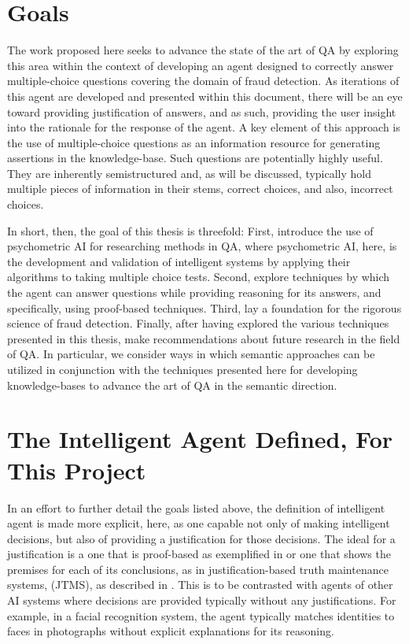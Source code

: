 \section{Goals}

The work proposed here seeks to advance the state of the art of QA by exploring this area within the context of developing an agent designed to correctly answer multiple-choice questions covering the domain of fraud detection.  As iterations of this agent are developed and presented within this document, there will be an eye toward providing justification of answers, and as such, providing the user insight into the rationale for the response of the agent. A key element of this approach is the use of multiple-choice questions as an information resource for generating assertions in the knowledge-base.  Such questions are potentially highly useful.  They are inherently semistructured and, as will be discussed, typically hold multiple pieces of information in their stems, correct choices, and also, incorrect choices.

In short, then, the goal of this thesis is threefold:  First, introduce the use of psychometric AI \cite{psychoai.ijcai03} for researching methods in QA, where psychometric AI, here, is the development and validation of intelligent systems by applying their algorithms to taking multiple choice tests.  Second, explore techniques by which the agent can answer questions while providing reasoning for its answers, and specifically, using proof-based techniques.  Third, lay a foundation for the rigorous science of fraud detection.  Finally, after having explored the various techniques presented in this thesis, make recommendations about future research in the field of QA.  In particular, we consider ways in which semantic approaches can be utilized in conjunction with the techniques presented here for developing knowledge-bases to advance the art of QA in the semantic direction.

\section{The Intelligent Agent Defined, For This Project}
In an effort to further detail the goals listed above, the definition of intelligent agent is made more explicit, here, as one capable not only of making intelligent decisions, but also of providing a justification for those decisions.  The ideal for a justification is a one that is proof-based as exemplified in \cite{bringsjord2015logicist} or one that shows the premises for each of its conclusions, as in justification-based truth maintenance systems, (JTMS), as described in \cite{russell_norvig_2010_sect12.6}. This is to be contrasted with agents of other AI systems where decisions are provided typically without any justifications.  For example, in a facial recognition system, the agent typically matches identities to faces in photographs without explicit explanations for its reasoning.  


